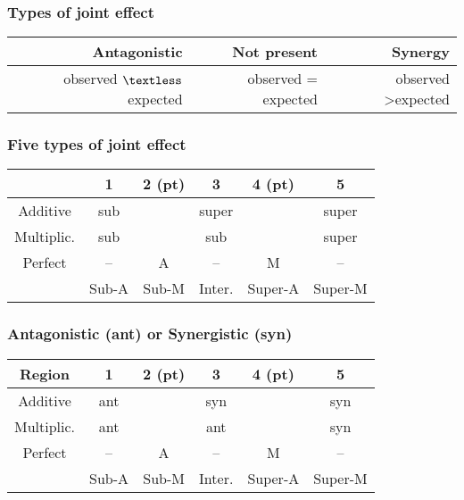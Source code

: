 \documentclass[landscape]{article}
\newcommand{\squeezeupf}{\vspace{-4mm}}
\newcommand{\squeezeupp}{\vspace{-2mm}}
\begin{document}
\begin{multicols}{3}
			\squeezeupf{}	
			\subsubsection{Types of joint effect}
				\begin{tabular}{r|r|r}
					Antagonistic & Not present & Synergy \\ \hline
					observed $\textless$ expected & observed = expected & observed \textgreater expected 
				\end{tabular}
				
			\squeezeupp{}
			\subsubsection[Five types of joint effect]{Five types of joint effect}
					\begin{center}
					\begin{tabular}{c|c|c|c|c|c}
						 & 1 & 2 (pt) & 3 & 4 (pt) & 5 \\ \hline
						Additive & sub & & super & & super \\ \hline
						Multiplic. & sub & & sub & & super \\ \hline
						Perfect & -- & A & -- & M & -- \\ \hline
						& Sub-A & Sub-M & Inter. & Super-A & Super-M \\ \hline
					\end{tabular}
					\end{center}
			
			\squeezeupp{}
			\subsubsection[Antagonistic or Synergistic]{Antagonistic (ant) or Synergistic (syn)}
					\begin{center}
					\begin{tabular}{c|c|c|c|c|c}
						Region & 1 & 2 (pt) & 3 & 4 (pt) & 5 \\ \hline
						Additive & ant & & syn & & syn \\ \hline
						Multiplic. & ant & & ant & & syn \\ \hline
						Perfect & -- & A & -- & M & -- \\ \hline
						& Sub-A & Sub-M & Inter. & Super-A & Super-M \\ \hline
					\end{tabular}
					\end{center}
				

\end{multicols}
\end{document}
